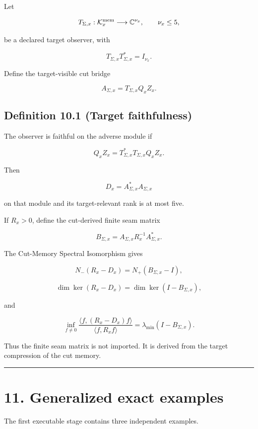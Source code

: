 Let

\[
T_{\Sigma,x}:
\mathcal K_x^{\rm mem}
\longrightarrow
\mathbb C^{\nu_x},
\qquad
\nu_x\le5,
\]

be a declared target observer, with

\[
T_{\Sigma,x}T_{\Sigma,x}^*=I_{\nu_x}.
\]

Define the target-visible cut bridge

\[
A_{\Sigma,x}
=T_{\Sigma,x}Q_xZ_x.
\]

\hypertarget{definition-10.1-target-faithfulness}{%
\subsection{Definition 10.1 (Target faithfulness)}\label{definition-10.1-target-faithfulness}}

The observer is faithful on the adverse module if

\[
\boxed{
Q_xZ_x
=T_{\Sigma,x}^*T_{\Sigma,x}Q_xZ_x.
}
\]

Then

\[
D_x=A_{\Sigma,x}^*A_{\Sigma,x}
\]

on that module and its target-relevant rank is at most five.

If \(R_x>0\), define the cut-derived finite seam matrix

\[
\boxed{
B_{\Sigma,x}
=A_{\Sigma,x}R_x^{-1}A_{\Sigma,x}^*.
}
\]

The Cut-Memory Spectral Isomorphism gives

\[
N_-(R_x-D_x)=N_+(B_{\Sigma,x}-I),
\]

\[
\dim\ker(R_x-D_x)=\dim\ker(I-B_{\Sigma,x}),
\]

and

\[
\inf_{f\ne0}
\frac{\langle f,(R_x-D_x)f\rangle}
     {\langle f,R_xf\rangle}
=
\lambda_{\min}(I-B_{\Sigma,x}).
\]

Thus the finite seam matrix is not imported. It is derived from the target
compression of the cut memory.

\begin{center}\rule{0.5\linewidth}{0.5pt}\end{center}

\hypertarget{generalized-exact-examples}{%
\section{11. Generalized exact examples}\label{generalized-exact-examples}}

The first executable stage contains three independent examples.

